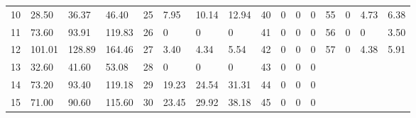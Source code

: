 \documentclass[a4paper,fleqn]{cas-dc}
\begin{document}
\begin{table*}[htbp]
{\begin{tabularx}{\linewidth}{c|YYY|c|YYY|c|YYY|c|YYY}
    10  & 28.50  & 36.37  & 46.40  & 25    & 7.95   & 10.14  & 12.94  & 
    40  & 0      & 0      & 0      & 55    & 0      & 4.73   & 6.38  \\
    11  & 73.60  & 93.91  & 119.83 & 26    & 0      & 0      & 0     & 
    41  & 0      & 0      & 0      & 56    & 0      & 0      & 3.50  \\
    12  & 101.01 & 128.89 & 164.46 & 27    & 3.40   & 4.34   & 5.54  & 
    42  & 0      & 0      & 0      & 57    & 0      & 4.38   & 5.91  \\
    13  & 32.60  & 41.60  & 53.08  & 28    & 0      & 0      & 0     & 
    43  & 0      & 0      & 0      &       &        &        &   \\
    14  & 73.20  & 93.40  & 119.18 & 29    & 19.23  & 24.54  & 31.31  & 
    44  & 0      & 0      & 0      &       &        &        &   \\
    15  & 71.00  & 90.60  & 115.60 & 30    & 23.45  & 29.92  & 38.18  & 
    45  & 0      & 0      & 0      &       &        &        &   \\
    \hline    
    \end{tabularx}
    \label{tab_load}
    }
\end{table*}
\end{document}
